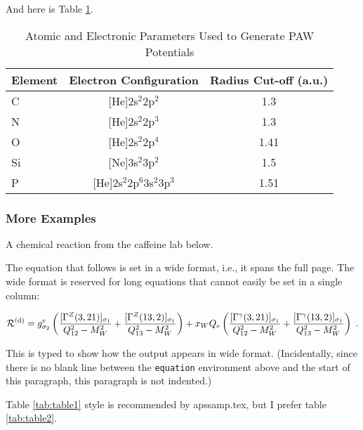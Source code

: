 \documentclass[letterpaper,amsmath,amssymb,prb,preprint,12pt]{revtex4-1}%
\begin{document}
And here is Table \ref{paw}.

\begin{table}[h]
\caption{Atomic and Electronic Parameters Used to Generate PAW Potentials}
\begin{tabular}{l@{\qquad}c@{\qquad}c}
\hline
Element&Electron Configuration&Radius Cut-off (a.u.)\\
\hline
\hline
C & [He]2s$^{2}$2p$^{2}$ & 1.3 \\
N & [He]2s$^{2}$2p$^{3}$ & 1.3 \\
O & [He]2s$^{2}$2p$^{4}$ & 1.41 \\
Si & [Ne]3s$^{2}$3p$^{2}$ & 1.5 \\
P & [He]2s$^{2}$2p$^{6}$3s$^{2}$3p$^{3}$ & 1.51 \\
\hline
\end{tabular}
\label{paw}
\end{table}

\subsubsection{More Examples}

A chemical reaction from the caffeine lab below.


The equation that follows is set in a wide format, i.e., it spans the full page. 
The wide format is reserved for long equations
that cannot easily be set in a single column:
\begin{widetext}
\begin{equation}
{\cal R}^{(\text{d})}=
 g_{\sigma_2}^e
 \left(
   \frac{[\Gamma^Z(3,21)]_{\sigma_1}}{Q_{12}^2-M_W^2}
  +\frac{[\Gamma^Z(13,2)]_{\sigma_1}}{Q_{13}^2-M_W^2}
 \right)
 + x_WQ_e
 \left(
   \frac{[\Gamma^\gamma(3,21)]_{\sigma_1}}{Q_{12}^2-M_W^2}
  +\frac{[\Gamma^\gamma(13,2)]_{\sigma_1}}{Q_{13}^2-M_W^2}
 \right)\;. 
 \label{eq:wideeq}
\end{equation}
\end{widetext}
This is typed to show how the output appears in wide format.
(Incidentally, since there is no blank line between the \texttt{equation} environment above 
and the start of this paragraph, this paragraph is not indented.)

Table \ref{tab:table1} style is recommended by apssamp.tex, but I prefer table \ref{tab:table2}.
\end{document}
